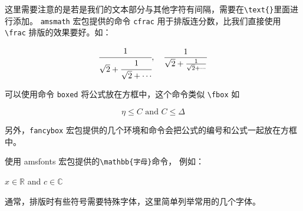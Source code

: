  这里需要注意的是若是我们的文本部分与其他字符有间隔，需要在\verb|\text{}|里面进行添加。
{}
\verb|amsmath| 宏包提供的命令 \verb|cfrac| 用于排版连分数，比我们直接使用 \verb|\frac| 排版的效果要好。如：
\begin{example}
\[
  \cfrac{1}{\sqrt 2 + \cfrac{1}{\sqrt 2 +\dotsb}},\quad
  \frac{1}{\sqrt 2 + \frac{1}{\sqrt 2 +\dotsb}}
\]
\end{example}




可以使用命令 \verb|boxed| 将公式放在方框中，这个命令类似 \verb|\fbox| 如
\begin{example}
\[
  \boxed{\eta \leq C \text{ and } C \leq \Delta}
\]
\end{example}

另外，\verb|fancybox| 宏包提供的几个环境和命令会把公式的编号和公式一起放在方框中。

使用 amsfonts 宏包提供的\verb|\mathbb{字母}|命令， 例如：
\begin{example}
 $x \in \mathbb{R}$ and $c \in \mathbb{C}$
\end{example}



通常，排版时有些符号需要特殊字体，这里简单列举常用的几个字体。


